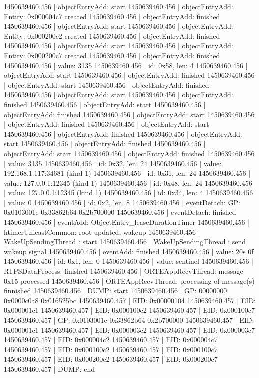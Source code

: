 1450639460.456 | objectEntryAdd: start
1450639460.456 | objectEntryAdd: Entity: 0x000004c7 created
1450639460.456 | objectEntryAdd: finished
1450639460.456 | objectEntryAdd: start
1450639460.456 | objectEntryAdd: Entity: 0x000200c2 created
1450639460.456 | objectEntryAdd: finished
1450639460.456 | objectEntryAdd: start
1450639460.456 | objectEntryAdd: Entity: 0x000200c7 created
1450639460.456 | objectEntryAdd: finished
1450639460.456 |   value: 3135
1450639460.456 |   id: 0x58, len: 4
1450639460.456 | objectEntryAdd: start
1450639460.456 | objectEntryAdd: finished
1450639460.456 | objectEntryAdd: start
1450639460.456 | objectEntryAdd: finished
1450639460.456 | objectEntryAdd: start
1450639460.456 | objectEntryAdd: finished
1450639460.456 | objectEntryAdd: start
1450639460.456 | objectEntryAdd: finished
1450639460.456 | objectEntryAdd: start
1450639460.456 | objectEntryAdd: finished
1450639460.456 | objectEntryAdd: start
1450639460.456 | objectEntryAdd: finished
1450639460.456 | objectEntryAdd: start
1450639460.456 | objectEntryAdd: finished
1450639460.456 | objectEntryAdd: start
1450639460.456 | objectEntryAdd: finished
1450639460.456 |   value: 3135
1450639460.456 |   id: 0x32, len: 24
1450639460.456 |   value: 192.168.1.117:34681 (kind 1)
1450639460.456 |   id: 0x31, len: 24
1450639460.456 |   value: 127.0.0.1:12345 (kind 1)
1450639460.456 |   id: 0x48, len: 24
1450639460.456 |   value: 127.0.0.1:12345 (kind 1)
1450639460.456 |   id: 0x34, len: 4
1450639460.456 |   value: 0
1450639460.456 |   id: 0x2, len: 8
1450639460.456 | eventDetach: GP: 0x0103001e 0x33862b64 0x2b700000
1450639460.456 | eventDetach: finished
1450639460.456 | eventAdd: ObjectEntry_leaseDurationTimer
1450639460.456 | htimerUnicastCommon: root updated, wakeup
1450639460.456 | WakeUpSendingThread : start
1450639460.456 | WakeUpSendingThread : send wakeup signal
1450639460.456 | eventAdd: finished
1450639460.456 |   value: 20s 0f
1450639460.456 |   id: 0x1, len: 0
1450639460.456 |   value: sentinel
1450639460.456 | RTPSDataProcess: finished
1450639460.456 | ORTEAppRecvThread: message 0x15 processed
1450639460.456 | ORTEAppRecvThread: processing of message(s) finnished
1450639460.456 | DUMP: start
1450639460.456 | GP:   00000000 0x0000c0a8 0x016525bc
1450639460.457 |   EID: 0x00000104
1450639460.457 |   EID: 0x000001c1
1450639460.457 |   EID: 0x000100c2
1450639460.457 |   EID: 0x000100c7
1450639460.457 | GP: 0x0103001e 0x33862b64 0x2b700000
1450639460.457 |   EID: 0x000001c1
1450639460.457 |   EID: 0x000003c2
1450639460.457 |   EID: 0x000003c7
1450639460.457 |   EID: 0x000004c2
1450639460.457 |   EID: 0x000004c7
1450639460.457 |   EID: 0x000100c2
1450639460.457 |   EID: 0x000100c7
1450639460.457 |   EID: 0x000200c2
1450639460.457 |   EID: 0x000200c7
1450639460.457 | DUMP: end
\endtt

